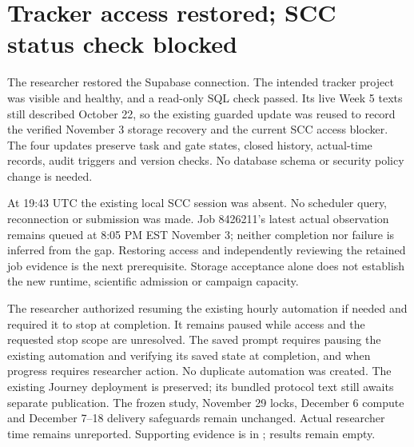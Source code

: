\section{Tracker access restored; SCC status check blocked}

The researcher restored the Supabase connection. The intended tracker project
was visible and healthy, and a read-only SQL check passed. Its live Week 5 texts
still described October 22, so the existing guarded update was reused to record
the verified November 3 storage recovery and the current SCC access blocker.
The four updates preserve task and gate states, closed history, actual-time
records, audit triggers and version checks. No database schema or security
policy change is needed.

At 19:43 UTC the existing local SCC session was absent. No scheduler query,
reconnection or submission was made. Job 8426211's latest actual observation
remains queued at 8:05 PM EST November 3; neither completion nor failure is
inferred from the gap. Restoring access and independently reviewing the retained
job evidence is the next prerequisite. Storage acceptance alone does not establish
the new runtime, scientific admission or campaign capacity.

The researcher authorized resuming the existing hourly automation if needed and
required it to stop at completion. It remains paused while access and the requested
stop scope are unresolved. The saved prompt requires pausing the existing automation
and verifying its saved state at completion, and when progress requires researcher
action. No duplicate automation was created. The existing Journey deployment is
preserved; its bundled protocol text still awaits separate publication. The frozen study,
November 29 locks, December 6 compute and December 7--18 delivery safeguards remain
unchanged. Actual researcher time remains unreported. Supporting evidence is in
; results remain empty.
